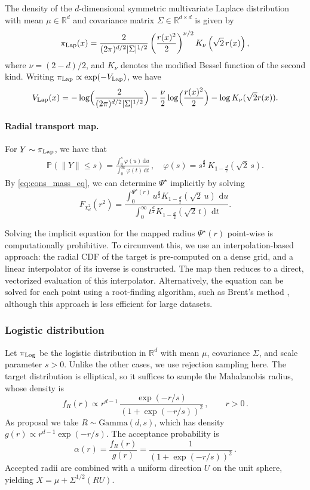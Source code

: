 \documentclass[twoside]{article}
\newcommand{\1}{\mathds{1}}
\newcommand{\R}{\mathbb{R}}
\renewcommand{\phi}{\varphi}
\newcommand*{\rd}{\mathrm{d}}
\newcommand*{\dd}{\, \rd}
\theoremstyle{plain}
\theoremstyle{definition}
\theoremstyle{remark}
\begin{document}
The density of the $d$-dimensional symmetric multivariate Laplace distribution 
with mean $\mu \in \mathbb{R}^d$ and covariance matrix $\Sigma \in \mathbb{R}^{d \times d}$ is given by
\begin{equation}
\pi_{\rm Lap}(x) = \frac{2}{ (2\pi)^{d/2} |\Sigma|^{1/2} }\left( \frac{r(x)^2}{2} \right)^{\nu/2}
K_\nu\left( \sqrt{2}\, r(x) \right),
\label{eq:laplace_density}
\end{equation}
where $\nu=(2-d)/2$, and $K_\nu$ denotes the modified Bessel function of the second kind. Writing $\pi_{\rm Lap} \propto \exp(-V_{\rm Lap})$, we have
\begin{equation}
V_{\rm Lap}(x) = - \log\Bigl(
\frac{2}{ (2\pi)^{d/2}  |\Sigma|^{1/2} }
\Bigr)
- \frac{\nu}{2} \log \Bigl( \frac{r(x)^2}{2} \Bigr)
- \log K_\nu( \sqrt{2} r(x)).
\label{eq:laplace_potential}
\end{equation}

\paragraph{Radial transport map.} For $Y \sim \pi_{\rm Lap}$, we have that
\begin{align*}
    \mathbb{P}(\|Y\|\le s)
=\frac{\displaystyle\int_0^{s}\phi(u)\dd u}
       {\displaystyle\int_0^{\infty}\phi(t)\dd t}\,, \quad  \phi(s)=s^{\frac d2}\,K_{1-\frac d2}(\sqrt{2}\,s).
\end{align*}
By \eqref{eq:cons_mass_eq}, we can determine $\Psi^\star$ implicitly by solving
\[
F_{\chi^2_d}(r^2)
= \frac{\displaystyle\int_0^{\Psi^\star(r)} u^{\frac d2} K_{1-\frac d2}(\sqrt{2}\,u)\,\dd u}{\displaystyle\int_0^{\infty} t^{\frac d2} K_{1-\frac d2}(\sqrt{2}\,t)\,\dd t}.
\]

Solving the implicit equation for the mapped radius $\Psi^{\star}(r)$ point-wise is computationally prohibitive. To circumvent this, we use an interpolation-based approach: the radial CDF of the target is pre-computed on a dense grid, and a linear interpolator of its inverse is constructed. The map then reduces to a direct, vectorized evaluation of this interpolator. Alternatively, the equation can be solved for each point using a root-finding algorithm, such as Brent's method \citep{brent1973some}, although this approach is less efficient for large datasets.

\subsubsection{Logistic distribution}
Let $\pi_{\rm Log}$ be the logistic distribution in $\R^d$ with mean $\mu$, covariance $\Sigma$, and scale parameter $s > 0$. {Unlike the other cases, we use rejection sampling here. The target distribution is elliptical, so it suffices to sample the Mahalanobis radius, whose density is
\[
f_R(r) \propto r^{d-1}\,\frac{\exp(-r/s)}{(1+\exp(-r/s))^{2}}\,, \qquad r>0\,.
\]
As proposal we take $R \sim \mathrm{Gamma}(d,s)$, which has density 
$g(r) \propto r^{d-1}\exp(-r/s)$.  
The acceptance probability is
\[
\alpha(r) = \frac{f_R(r)}{g(r)} = \frac{1}{(1+\exp(-r/s))^{2}}\,.
\]
Accepted radii are combined with a uniform direction $U$ on the unit sphere, 
yielding $X = \mu + \Sigma^{1/2}(R U)$.}
\end{document}
